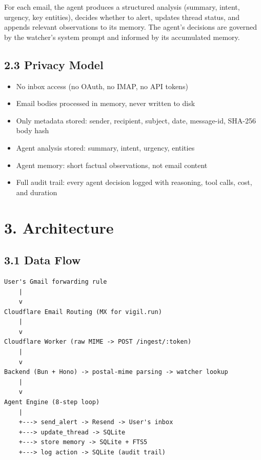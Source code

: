 \documentclass[10pt]{article}
\begin{document}
For each email, the agent produces a structured analysis (summary, intent, urgency, key entities),
decides whether to alert, updates thread status, and appends relevant observations to its memory.
The agent's decisions are governed by the watcher's system prompt and informed by its accumulated memory.

\subsection*{2.3 Privacy Model}
\begin{itemize}[nosep]
  \item No inbox access (no OAuth, no IMAP, no API tokens)
  \item Email bodies processed in memory, never written to disk
  \item Only metadata stored: sender, recipient, subject, date, message-id, SHA-256 body hash
  \item Agent analysis stored: summary, intent, urgency, entities
  \item Agent memory: short factual observations, not email content
  \item Full audit trail: every agent decision logged with reasoning, tool calls, cost, and duration
\end{itemize}

\section*{3. Architecture}

\subsection*{3.1 Data Flow}
\begin{lstlisting}
User's Gmail forwarding rule
    |
    v
Cloudflare Email Routing (MX for vigil.run)
    |
    v
Cloudflare Worker (raw MIME -> POST /ingest/:token)
    |
    v
Backend (Bun + Hono) -> postal-mime parsing -> watcher lookup
    |
    v
Agent Engine (8-step loop)
    |
    +---> send_alert -> Resend -> User's inbox
    +---> update_thread -> SQLite
    +---> store memory -> SQLite + FTS5
    +---> log action -> SQLite (audit trail)
\end{lstlisting}
\end{document}
